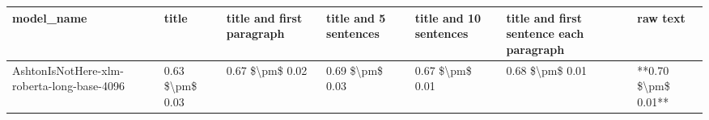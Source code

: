 \begin{tabular}{lllllll}
\toprule
                                model\_name &           title & title and first paragraph & title and 5 sentences & title and 10 sentences & title and first sentence each paragraph &            raw text \\
\midrule
AshtonIsNotHere-xlm-roberta-long-base-4096 & 0.63 \$\textbackslash pm\$ 0.03 &           0.67 \$\textbackslash pm\$ 0.02 &       0.69 \$\textbackslash pm\$ 0.03 &        0.67 \$\textbackslash pm\$ 0.01 &                         0.68 \$\textbackslash pm\$ 0.01 & **0.70 \$\textbackslash pm\$ 0.01** \\
\bottomrule
\end{tabular}
